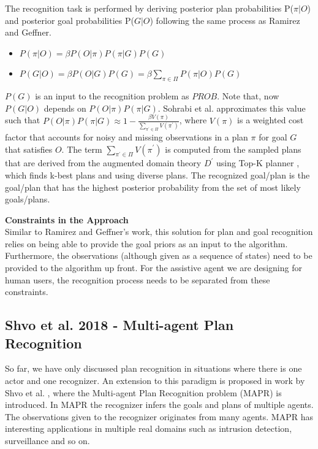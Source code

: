 The recognition task is performed by deriving posterior plan probabilities P($\pi|O$) and posterior goal probabilities P($G|O$) following the same process as Ramirez and Geffner. 
\begin{itemize}
\item $P(\pi|O) = \beta P(O|\pi)P(\pi|G)P(G)$
\item $P(G|O) = \beta P(O|G)P(G) = \beta \sum_{\pi \in \Pi}P(\pi|O)P(G)$
\end{itemize}
$P(G)$ is an input to the recognition problem as $PROB$. Note that, now $P(G|O)$ depends on $P(O|\pi)P(\pi|G)$. Sohrabi et al. approximates this value such that $P(O|\pi)P(\pi|G) \approx 1- \frac{\beta V(\pi)}{\sum_{\pi^\prime \in \Pi}V(\pi^\prime)}$, where $V(\pi)$ is a weighted cost factor that accounts for noisy and missing observations in a plan $\pi$ for goal $G$ that satisfies $O$.  The term $\sum_{\pi^\prime \in \Pi}V(\pi^\prime)$ is computed from the sampled plans that are derived from the augmented domain theory $D^\prime$ using Top-K planner \cite{riabov2014}, which finds k-best plans and using diverse plans. The recognized goal/plan is the goal/plan that has the highest posterior probability from the set of most likely goals/plans.

\noindent\textbf{Constraints in the Approach}\\
Similar to Ramirez and Geffner's work, this solution for plan and goal recognition relies on being able to provide the goal priors as an input to the algorithm. Furthermore, the observations (although given as a sequence of states) need to be provided to the algorithm up front. For the assistive agent we are designing for human users, the recognition process needs to be separated from these constraints.

\subsection{Shvo et al. 2018 - Multi-agent Plan Recognition}
So far, we have only discussed plan recognition in situations where there is one actor and one recognizer. An extension to this paradigm is proposed in work by Shvo et al. \citeyear{shvo2018}, where the Multi-agent Plan Recognition problem (MAPR) is introduced. In MAPR the recognizer infers the goals and plans of multiple agents. The observations given to the recognizer originates from many agents. MAPR has interesting applications in multiple real domains such as intrusion detection, surveillance and so on.

